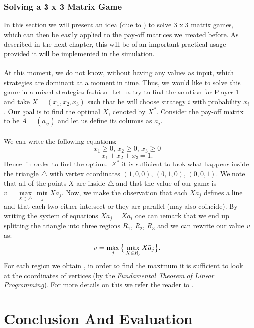 \documentclass[10pt, a4paper]{report}
\begin{document}
\subsection{Solving a 3 x 3 Matrix Game}
In this section we will present an idea (due to \cite{TheoryOfGames}) to solve 3 x 3 matrix games, which can then be easily applied to the pay-off matrices we created before. As described in the next chapter, this will be of an important practical usage provided it will be implemented in the simulation.\\\\
At this moment, we do not know, without having any values as input, which strategies are dominant at a moment in time. Thus, we would like to solve this game in a mixed strategies fashion. Let us try to find the solution for Player 1 and take $X=(x_1,x_2,x_3)$ such that he will choose strategy $i$ with probability $x_i$. Our goal is to find the optimal $X$, denoted by $X^*$. Consider the pay-off matrix to be $A = (a_{ij})$ and let us define its columns as $\bar{a}_j$.\\\\
We can write the following equations:
$$x_1\ge 0,\ x_2\ge 0,\ x_3\ge 0$$
$$x_1+x_2+x_3=1.$$
Hence, in order to find the optimal $X^*$ it is sufficient to look what happens inside the triangle $\triangle$ with vertex coordinates $(1,0,0)$, $(0,1,0)$, $(0,0,1)$. We note that all of the points $X$ are inside $\triangle$ and that the value of our game is $v = \max\limits_{X\in \triangle}\min\limits_{j} X\bar{a}_j$. Now, we make the observation that each $X\bar{a}_j$ defines a line and that each two either intersect or they are parallel (may also coincide). By writing the system of equations $X\bar{a}_j = X\bar{a}_i$ one can remark that we end up splitting the triangle into three regions $R_1$, $R_2$, $R_3$ and we can rewrite our value $v$ as: $$v = \max\limits_{j}\big{\{}\max\limits_{X\in R_j} X\bar{a}_j\big{\}}.$$
For each region we obtain , in order to find the maximum it is sufficient to look at the coordinates of vertices (by the \textit{Fundamental Theorem of Linear Programming}). For more details on this we refer the reader to \cite{TheoryOfGames}.

\chapter{Conclusion And Evaluation}\label{ch:concl}

\end{document}
